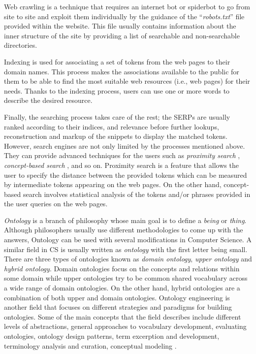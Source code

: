 Web crawling is a technique that requires an internet bot or spiderbot to go from site to site and 
exploit them individually by the guidance of the ``\textit{robots.txt}'' file provided within the 
website. This file usually contains information about the inner structure of the site by providing 
a list of searchable and non-searchable directories.

Indexing is used for associating a set of tokens from the web pages to their domain names. This 
process makes the associations available to the public for them to be able to find the most suitable 
web resources (i.e., web pages) for their needs. Thanks to the indexing process, users can use one or 
more words to describe the desired resource.

Finally, the searching process takes care of the rest; the SERPs are usually ranked 
according to their indices, and relevance before further lookups, reconstruction and markup of the 
snippets to display the matched tokens. However, search engines are not only limited by the 
processes mentioned above. They can provide advanced techniques for the users such as 
\textit{proximity search} \cite{enwiki:1058506896}, \textit{concept-based search} 
\cite{enwiki:1093304368}, and so on. Proximity search is a feature 
that allows the user to specify the distance between the provided tokens which can be measured by 
intermediate tokens appearing on the web pages. On the other hand, concept-based search involves 
statistical analysis of the tokens and/or phrases provided in the user queries on the web pages.

\textit{Ontology} is a branch of philosophy whose main goal is to define a \textit{being} or 
\textit{thing}. Although philosophers usually use different methodologies to come up with the 
answers, Ontology can be used with several modifications in Computer Science. A similar field in 
CS is usually written as \textit{ontology} with the first letter being small. There are three 
types of ontologies known as \textit{domain ontology}, \textit{upper ontology} and \textit{hybrid 
ontology}. Domain ontologies focus on the concepts and relations within some domain while upper 
ontologies try to be common shared vocabulary across a wide range of domain ontologies. On the other 
hand, hybrid ontologies are a combination of both upper and domain ontologies. Ontology engineering 
is another field that focuses on different strategies and paradigms for building ontologies. 
Some of the main concepts that the field describes include different levels of abstractions, 
general approaches to vocabulary development, evaluating ontologies, ontology design patterns, 
term excerption and development, terminology analysis and curation, conceptual modeling 
\cite{samek2017,trokanas2018471}.

